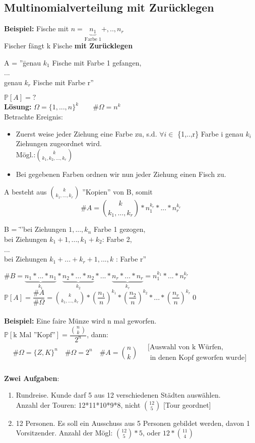 \subsection{Multinomialverteilung mit Zurücklegen}
\textbf{Beispiel:} Fische mit $n = \underbrace{n_1}_\text{Farbe 1}+,..,n_r$\medskip\\
Fischer fängt k Fische \textbf{mit Zurücklegen}
\begin{tabbing}
	A = ''\= genau $k_1$ Fische mit Farbe 1 gefangen,\\
	\> ...\\
	\> genau $k_r$ Fische mit Farbe r''
\end{tabbing}
$\mathds{P}[A] = ?$\medskip\\
\textbf{Lösung:} $\Omega = \{1,...,n\}^k \qquad \#\Omega = n^k$\\
Betrachte Ereignis:
\begin{itemize}
	\item Zuerst weise jeder Ziehung eine Farbe zu, s.d. $\forall i \in $ \{1,..,r\} Farbe i genau $k_i$ Ziehungen zugeordnet wird.\\Mögl.:$\binom{k}{k_1,k_2,...,k_r}$
	\item Bei gegebenen Farben ordnen wir nun jeder Ziehung einen Fisch zu.
\end{itemize}
A besteht aus $\binom{k}{k_1,...,k_r}$ ''Kopien'' von B, somit
$$\#A = \binom{k}{k_1,...,k_r}*n_1^{k_r}*...*n_r^{k_r}$$
\begin{tabbing}
	B = \= ''bei Ziehungen $1,...,k_n$ Farbe 1 gezogen,\\
	\> bei Ziehungen $k_1+1,...,k_1+k_2$: Farbe 2,\\
	\>...\\
	\> bei Ziehungen $k_1+...+k_r+1,...,k$ : Farbe r''
\end{tabbing}
$\#B=\underbrace{n_1*...*n_1}_{k_1}*\underbrace{n_2*...*n_2}_{k_2}*...*\underbrace{n_r*...*n_r}_{k_r} = n_1^{k_1}*...*n_r^{k_r}$\medskip\\
$\mathds{P}[A] = \dfrac{\#A}{\#\Omega}= \binom{k}{k_1,...,k_r}*\left(\dfrac{n_1}{n}\right)^{k_1}*\left(\dfrac{n_2}{n}\right)^{k_2}*...*\left(\dfrac{n_r}{n}\right)^{k_r}$\qed\\\\
\textbf{Beispiel:} Eine faire Münze wird n mal geworfen.\medskip\\ $\mathds{P}[\text{k Mal ''Kopf''}]= \dfrac{\binom{n}{k}}{2^n}$, dann: 
$$\#\Omega = \{Z, K\}^n\quad \#\Omega = 2^n\quad \#A=\binom{n}{k} \quad \substack{\text{[Auswahl von k Würfen,}\\\text{ in denen Kopf geworfen wurde]}}$$\\
\textbf{Zwei Aufgaben}:
\begin{enumerate}
	\item Rundreise. Kunde darf 5 aus 12 verschiedenen Städten auswählen.\\Anzahl der Touren: 12*11*10*9*8, nicht $\binom{12}{5}$ [Tour geordnet]
	\item 12 Personen. Es soll ein Ausschuss aus 5 Personen gebildet werden, davon 1 Vorsitzender. Anzahl der Mögl: $\binom{12}{5}*5$, oder $12*\binom{11}{4}$\end{enumerate}
